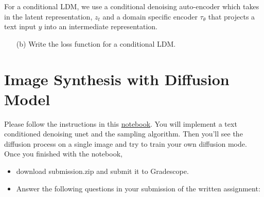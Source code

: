\documentclass[a4paper]{article}
\begin{document}
For a conditional LDM, we use a conditional denoising auto-encoder which takes in the latent representation, \(z_t\) and a domain specific encoder \(\tau_{\theta}\) that projects a text input \(y\) into an intermediate representation.  
\begin{itemize}
    \item [(b)]
    Write the loss function for a conditional LDM.
   
\end{itemize}

\section{Image Synthesis with Diffusion Model}

Please follow the instructions in this \href{https://colab.research.google.com/drive/1mmyvwlYvAnnfIBIr29bMvOEnL2mUcPHm?usp=sharing}{notebook}. 
You will implement a text conditioned denoising unet and the sampling algorithm. Then you'll see the diffusion process on a single image and try to train your own diffusion mode. Once you finished with the notebook,
\begin{itemize}
    \item download submission.zip and submit it to Gradescope.

    \item Answer the following questions in your submission of the written assignment:
\end{itemize}
\end{document}
